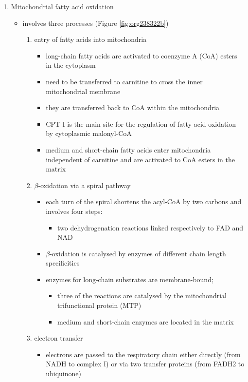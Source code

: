 \documentclass{scrartcl}
\begin{document}
\begin{enumerate}
\item Mitochondrial fatty acid oxidation
\label{sec:org6ace931}

\begin{itemize}
\item involves three processes (Figure \ref{fig:org238322b})
\begin{enumerate}
\item entry of fatty acids into mitochondria
\begin{itemize}
\item long-chain fatty acids are activated to coenzyme A (CoA) esters
in the cytoplasm
\item need to be transferred to carnitine to cross the inner
mitochondrial membrane
\item they are transferred back to CoA within the mitochondria
\item CPT I is the main site for the regulation of fatty acid
oxidation by cytoplasmic malonyl-CoA
\item medium and short-chain fatty acids enter mitochondria
independent of carnitine and are activated to CoA esters in the
matrix
\end{itemize}
\item \(\beta\)-oxidation via a spiral pathway
\begin{itemize}
\item each turn of the spiral shortens the acyl-CoA by two carbons and involves four steps:
\begin{itemize}
\item two dehydrogenation reactions linked respectively to FAD and NAD
\end{itemize}
\item \(\beta\)-oxidation is catalysed by enzymes of different chain
length specificities
\item enzymes for long-chain substrates are membrane-bound;
\begin{itemize}
\item three of the reactions are catalysed by the mitochondrial
trifunctional protein (MTP)
\item medium and short-chain enzymes are located in the matrix
\end{itemize}
\end{itemize}
\item electron transfer
\begin{itemize}
\item electrons are passed to the respiratory chain either directly
(from NADH to complex I) or via two transfer proteins (from
FADH2 to ubiquinone)
\end{itemize}
\end{enumerate}
\end{itemize}


\end{enumerate}
\end{document}
